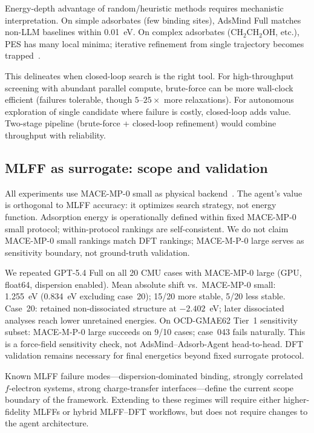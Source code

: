 Energy-depth advantage of random/heuristic methods requires mechanistic interpretation.
On simple adsorbates (few binding sites), AdsMind Full matches non-LLM baselines within 0.01~eV.
On complex adsorbates (CH$_2$CH$_2$OH, etc.), PES has many local minima; iterative refinement from single trajectory becomes trapped~\cite{lan2023adsorbml,zitnick2020introduction}.

This delineates when closed-loop search is the right tool.
For high-throughput screening with abundant parallel compute, brute-force can be more wall-clock efficient (failures tolerable, though $5$--$25\times$ more relaxations).
For autonomous exploration of single candidate where failure is costly, closed-loop adds value.
Two-stage pipeline (brute-force + closed-loop refinement) would combine throughput with reliability.

\subsection{MLFF as surrogate: scope and validation}

All experiments use MACE-MP-0 small as physical backend~\cite{batatia2023foundation,deng2023chgnet}.
The agent's value is orthogonal to MLFF accuracy: it optimizes search strategy, not energy function.
Adsorption energy is operationally defined within fixed MACE-MP-0 small protocol; within-protocol rankings are self-consistent.
We do not claim MACE-MP-0 small rankings match DFT rankings; MACE-M-P-0 large serves as sensitivity boundary, not ground-truth validation.

We repeated GPT-5.4 Full on all 20 CMU cases with MACE-MP-0 large (GPU, float64, dispersion enabled).
Mean absolute shift vs.\ MACE-MP-0 small: 1.255~eV (0.834~eV excluding case~20); 15/20 more stable, 5/20 less stable.
Case~20: retained non-dissociated structure at $-2.402$~eV; later dissociated analyses reach lower unretained energies.
On OCD-GMAE62 Tier~1 sensitivity subset: MACE-M-P-0 large succeeds on 9/10 cases; case~043 fails naturally.
This is a force-field sensitivity check, not AdsMind--Adsorb-Agent head-to-head.
DFT validation remains necessary for final energetics beyond fixed surrogate protocol.

Known MLFF failure modes---dispersion-dominated binding, strongly correlated $f$-electron systems, strong charge-transfer interfaces---define the current scope boundary of the framework.
Extending to these regimes will require either higher-fidelity MLFFs or hybrid MLFF--DFT workflows, but does not require changes to the agent architecture.

